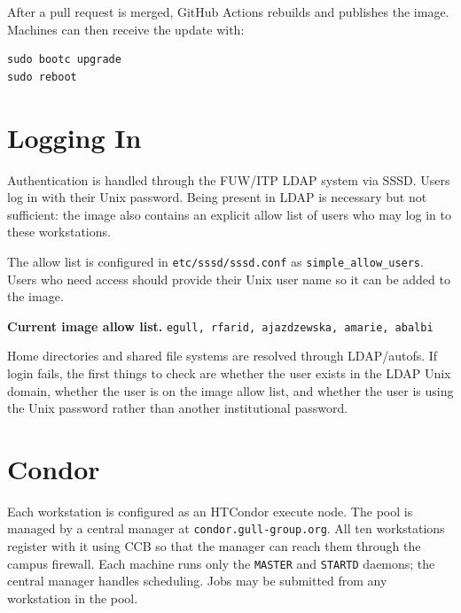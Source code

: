 \documentclass[11pt,a4paper]{article}
\newenvironment{keybox}[1]{%
  \begin{mdframed}[backgroundcolor=boxbg,linecolor=boxframe,linewidth=1pt,
    innertopmargin=6pt,innerbottommargin=6pt,
    innerrightmargin=8pt,innerleftmargin=8pt]
  \textbf{#1.}\quad}{\end{mdframed}}
\begin{document}
After a pull request is merged, GitHub Actions rebuilds and publishes the image.
Machines can then receive the update with:

\begin{verbatim}
sudo bootc upgrade
sudo reboot
\end{verbatim}

\section{Logging In}
\label{sec:login}

Authentication is handled through the FUW/ITP LDAP system via SSSD.  Users log
in with their Unix password.  Being present in LDAP is necessary but not
sufficient: the image also contains an explicit allow list of users who may log
in to these workstations.

The allow list is configured in \texttt{etc/sssd/sssd.conf} as
\texttt{simple\_allow\_users}.  Users who need access should provide their Unix
user name so it can be added to the image.

\begin{keybox}{Current image allow list}
\texttt{egull, rfarid, ajazdzewska, amarie, abalbi}
\end{keybox}

Home directories and shared file systems are resolved through LDAP/autofs.  If
login fails, the first things to check are whether the user exists in the LDAP
Unix domain, whether the user is on the image allow list, and whether the user
is using the Unix password rather than another institutional password.

\section{Condor}
\label{sec:condor}

Each workstation is configured as an HTCondor execute node.  The pool is managed
by a central manager at \texttt{condor.gull-group.org}.  All ten workstations
register with it using CCB so that the manager can reach them through the campus
firewall.  Each machine runs only the \texttt{MASTER} and \texttt{STARTD}
daemons; the central manager handles scheduling.  Jobs may be submitted from any
workstation in the pool.
\end{document}
